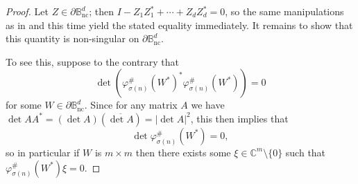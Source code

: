 \documentclass[11pt,reqno]{amsart}
\def\p{\varphi}
\def\s{\sigma}
\def\CC{\mathbb{C}}
\def\BB{\mathbb{B}}
\def\nc{\mathrm{nc}}
\theoremstyle{definition}
\numberwithin{equation}{section}
\begin{document}
\begin{proof}
    Let \(Z \in \partial \BB^d_\nc\); then \(I - Z_1Z_1^* + \cdots + Z_dZ_d^* = 0\), so the same manipulations as in  and  this time yield the stated equality immediately. It remains to show that this quantity is non-singular on \(\partial \BB_\nc^d\).
    
    To see this, suppose to the contrary that
    \[
        \det \left(\p_{\s(n)}^\#(W^*)^*\p_{\s(n)}^\#(W^*)\right) = 0
    \]
    for some \(W \in \partial \BB^d_\nc\). Since for any matrix \(A\) we have \(\det AA^* = (\det A) (\overline{\det A}) = \lvert \det A \rvert^2\), this then implies that
    \[
        \det \p_{\s(n)}^\#(W^*) = 0,
    \]
    so in particular if \(W\) is \(m \times m\) then there exists some \(\xi \in \CC^{m}\setminus\{0\}\) such that \(\p_{\s(n)}^\#(W^*)\xi = 0\).


\end{proof}
\end{document}
